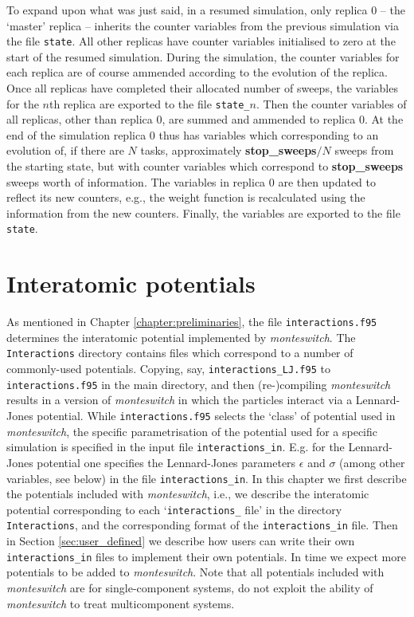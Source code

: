\documentclass{report}
\begin{document}
To expand upon what was just said, in a resumed simulation, only replica 0 -- the `master' replica -- inherits the counter variables from the previous 
simulation via the file \texttt{state}. All other replicas have counter variables initialised to zero at the start of the resumed simulation.
During the simulation, the counter variables for each replica are of course ammended according to the evolution of the replica. Once all replicas have
completed their allocated number of sweeps, the variables for the $n$th replica are exported to the file \texttt{state\_}$n$. Then 
the counter variables of all replicas, other than replica 0, are summed and ammended to replica 0. At the end of the simulation replica 0 thus has
variables which corresponding to an evolution of, if there are $N$ tasks, approximately \textbf{stop\_sweeps}$/N$ sweeps from the starting state, 
but with counter variables which correspond to \textbf{stop\_sweeps} sweeps worth of information. The variables in replica 0 are then updated to reflect 
its new counters, e.g., the weight function is recalculated using the information from the new counters. Finally, the variables are
exported to the file \texttt{state}. 



\chapter{Interatomic potentials}\label{chapter:interactions}
As mentioned in Chapter \ref{chapter:preliminaries}, the file \texttt{interactions.f95} determines the interatomic potential implemented by
\emph{monteswitch}. The \texttt{Interactions} directory contains files which correspond to a number of commonly-used potentials. Copying, say,
\texttt{interactions\_LJ.f95} to \texttt{interactions.f95} in the main directory, and then (re-)compiling \emph{monteswitch} results in a version 
of \emph{monteswitch} in which the particles interact via a Lennard-Jones potential. While \texttt{interactions.f95} selects the `class' of potential
used in \emph{monteswitch}, the specific parametrisation of the potential used for a specific simulation is specified in the input file
\texttt{interactions\_in}. E.g. for the Lennard-Jones potential one specifies the Lennard-Jones parameters $\epsilon$ and $\sigma$ (among other
variables, see below) in the file \texttt{interactions\_in}. In this chapter we first describe the potentials included with \emph{monteswitch},
i.e., we describe the interatomic potential corresponding to each `\texttt{interactions\_} file' in the directory \texttt{Interactions}, and the
corresponding format of the \texttt{interactions\_in} file. Then in Section \ref{sec:user_defined} we describe how users can write their own
\texttt{interactions\_in} files to implement their own potentials. In time we expect more potentials to be added to \emph{monteswitch}.
Note that all potentials included with \emph{monteswitch} are for single-component systems, do not exploit the ability of \emph{monteswitch} 
to treat multicomponent systems.
\end{document}
